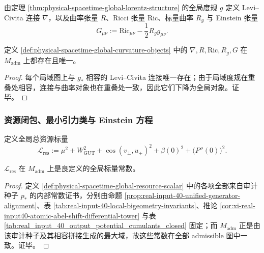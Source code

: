 \begin{definition}\label{def:physical-spacetime-global-curvature-objects}
由定理 \ref{thm:physical-spacetime-global-lorentz-structure} 的全局度规 \(g\) 定义 Levi--Civita 连接 \(\nabla\)，以及曲率张量 \(R\)、Ricci 张量 \(\mathrm{Ric}\)、标量曲率 \(R_g\) 与 Einstein 张量
\[
G_{\mu\nu}:=\mathrm{Ric}_{\mu\nu}-\frac12 R_g g_{\mu\nu}.
\]
\end{definition}

\begin{proposition}[全局几何对象的存在唯一性]\label{prop:physical-spacetime-global-geometric-objects}
定义 \ref{def:physical-spacetime-global-curvature-objects} 中的 \(\nabla,R,\mathrm{Ric},R_g,G\) 在 \(M_{\mathrm{adm}}\) 上都存在且唯一。
\end{proposition}
\begin{proof}
每个局域图上与 \(g_\ast\) 相容的 Levi--Civita 连接唯一存在；由于局域度规在重叠处相容，连接与曲率对象也在重叠处一致，因此它们下降为全局对象。证毕。
\end{proof}

\subsubsection{资源闭包、最小引力类与 Einstein 方程}

\begin{definition}[全局总资源标量]\label{def:physical-spacetime-global-resource-scalar}
定义全局总资源标量
\[
\mathcal L_{\mathrm{res}}
:=
\mu^2+W_{\mathrm{GUT}}^2+\cos(v_\perp,u_+)^2+\beta(0)^2+\bigl(P''(0)\bigr)^2.
\]
\end{definition}

\begin{proposition}[总资源标量的良定性]\label{prop:physical-spacetime-resource-scalar-well-defined}
\(\mathcal L_{\mathrm{res}}\) 在 \(M_{\mathrm{adm}}\) 上是良定义的全局标量常数。
\end{proposition}
\begin{proof}
定义 \ref{def:physical-spacetime-global-resource-scalar} 中的各项全部来自审计种子 \(p_\ast\) 的内部常数证书，分别由命题 \ref{prop:real-input-40-unified-generator-alignment}、表 \ref{tab:real-input-40-local-bigeometry-invariants}、推论 \ref{cor:xi-real-input40-atomic-abel-shift-differential-tower} 与表 \ref{tab:real_input_40_output_potential_cumulants_closed} 固定；而 \(M_{\mathrm{adm}}\) 正是由该审计种子及其相容拼接生成的最大域，故这些常数在全部 admissible 图中一致。证毕。
\end{proof}

